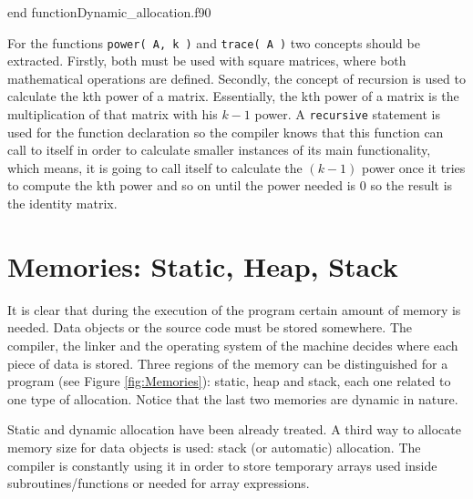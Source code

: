 {end function}{Dynamic_allocation.f90}

For the functions \texttt{power( A, k )} and \texttt{trace( A )} two concepts should be extracted. Firstly, both must be used with square matrices, where both mathematical operations are defined. Secondly, the concept of recursion is used to calculate the kth power of a matrix. Essentially, the kth power of a matrix is the multiplication of that matrix with his $ k-1 $ power. A \texttt{recursive} statement is used for the function declaration so the compiler knows that this function can call to itself in order to calculate smaller instances of its main functionality, which means, it is going to call itself to calculate the $ (k-1) $ power once it tries to compute the kth power and so on until the power needed is 0 so the result is the identity matrix. 



\section{Memories: Static, Heap, Stack}

It is clear that during the execution of the program certain amount of memory is needed. Data objects or the source code 
must be stored somewhere. The compiler, the linker and the operating system of the machine decides where each piece of data is stored. 
Three regions of the memory can be distinguished for a program (see Figure \ref{fig:Memories}): 
static, heap and stack, each one related to one type of allocation. Notice that the last two memories are dynamic in nature.

Static and dynamic allocation have been already treated. A third way to allocate memory size for data objects is used: 
stack (or automatic) allocation. The compiler is constantly using it 
in order to store temporary arrays used 
inside subroutines/functions or needed for array expressions.


